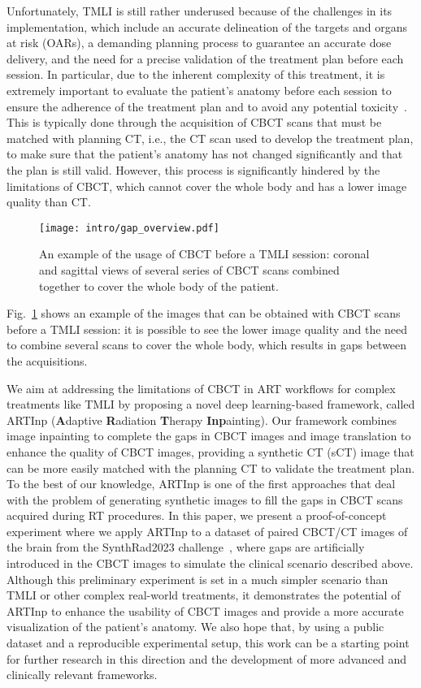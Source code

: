 Unfortunately, TMLI is still rather underused because of the challenges in its implementation, which include an accurate delineation of the targets and organs at risk (OARs), a demanding planning process to guarantee an accurate dose delivery, and the need for a precise validation of the treatment plan before each session.
In particular, due to the inherent complexity of this treatment, it is extremely important to evaluate the patient's anatomy before each session to ensure the adherence of the treatment plan and to avoid any potential toxicity~\cite{Zhang2015}.
This is typically done through the acquisition of CBCT scans that must be matched with planning CT, i.e., the CT scan used to develop the treatment plan, to make sure that the patient's anatomy has not changed significantly and that the plan is still valid.
However, this process is significantly hindered by the limitations of CBCT, which cannot cover the whole body and has a lower image quality than CT.
\begin{figure}
	\centering
		\texttt{[image: intro/gap\_overview.pdf]}
	\caption{An example of the usage of CBCT before a TMLI session: coronal and sagittal views of several series of CBCT scans combined together to cover the whole body of the patient.}
	\label{fig:gap_overview}
\end{figure}
Fig.~\ref{fig:gap_overview} shows an example of the images that can be obtained with CBCT scans before a TMLI session: it is possible to see the lower image quality and the need to combine several scans to cover the whole body, which results in gaps between the acquisitions.

We aim at addressing the limitations of CBCT in ART workflows for complex treatments like TMLI by proposing a novel deep learning-based framework, called ARTInp (\textbf{A}daptive \textbf{R}adiation \textbf{T}herapy \textbf{Inp}ainting). 
Our framework combines image inpainting to complete the gaps in CBCT images and image translation to enhance the quality of CBCT images, providing a synthetic CT (sCT) image that can be more easily matched with the planning CT to validate the treatment plan.
To the best of our knowledge, ARTInp is one of the first approaches that deal with the problem of generating synthetic images to fill the gaps in CBCT scans acquired during RT procedures.
In this paper, we present a proof-of-concept experiment where we apply ARTInp to a dataset of paired CBCT/CT images of the brain from the SynthRad2023 challenge~\cite{Thummerer2023}, where gaps are artificially introduced in the CBCT images to simulate the clinical scenario described above.
Although this preliminary experiment is set in a much simpler scenario than TMLI or other complex real-world treatments, it demonstrates the potential of ARTInp to enhance the usability of CBCT images and provide a more accurate visualization of the patient's anatomy.
We also hope that, by using a public dataset and a reproducible experimental setup, this work can be a starting point for further research in this direction and the development of more advanced and clinically relevant frameworks.


